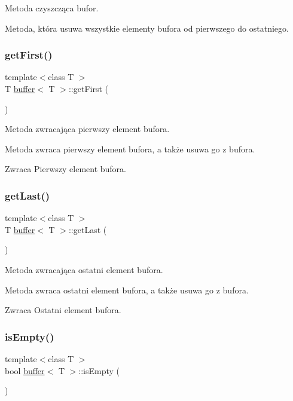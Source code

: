 Metoda czyszcząca bufor. 

Metoda, która usuwa wszystkie elementy bufora od pierwszego do ostatniego. \mbox{\label{classbuffer_a12c4847a2d852f62f6e17cda43d3720d}} 
\subsubsection{\texorpdfstring{get\+First()}{getFirst()}}
{\footnotesize\ttfamily template$<$class T $>$ \\
T \hyperlink{classbuffer}{buffer}$<$ T $>$\+::get\+First (\begin{DoxyParamCaption}{ }\end{DoxyParamCaption})}



Metoda zwracająca pierwszy element bufora. 

Metoda zwraca pierwszy element bufora, a także usuwa go z bufora. \begin{DoxyReturn}{Zwraca}
Pierwszy element bufora. 
\end{DoxyReturn}
\mbox{\label{classbuffer_a61bf98727f79c794f4e77b36499a87f9}} 
\subsubsection{\texorpdfstring{get\+Last()}{getLast()}}
{\footnotesize\ttfamily template$<$class T $>$ \\
T \hyperlink{classbuffer}{buffer}$<$ T $>$\+::get\+Last (\begin{DoxyParamCaption}{ }\end{DoxyParamCaption})}



Metoda zwracająca ostatni element bufora. 

Metoda zwraca ostatni element bufora, a także usuwa go z bufora. \begin{DoxyReturn}{Zwraca}
Ostatni element bufora. 
\end{DoxyReturn}
\mbox{\label{classbuffer_a6529128cce7c8b3f85cdae95f22b0589}} 
\subsubsection{\texorpdfstring{is\+Empty()}{isEmpty()}}
{\footnotesize\ttfamily template$<$class T $>$ \\
bool \hyperlink{classbuffer}{buffer}$<$ T $>$\+::is\+Empty (\begin{DoxyParamCaption}{ }\end{DoxyParamCaption})}



